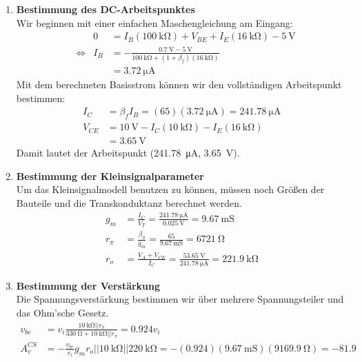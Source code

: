 \documentclass[11pt,a4paper,titlepage]{article}
\begin{document}
\begin{enumerate}
	\item \textbf{Bestimmung des DC-Arbeitspunktes}\\
	Wir beginnen mit einer einfachen Maschengleichung am Eingang:
	\begin{equation}
	\begin{aligned}
	&&0 &= I_B(\SI{100}{\kilo\ohm}) + V_{BE} + I_E(\SI{16}{\kilo\ohm}) - \SI{5}{\volt} \\
	&\Leftrightarrow &I_B  &= -\frac{\SI{0.7}{\volt} - \SI{5}{\volt}}{\SI{100}{\kilo\ohm} + (1+\beta_f)(\SI{16}{\kilo\ohm})} \\
	&&&= \SI{3.72}{\micro\ampere}
	\end{aligned}
	\end{equation}
	Mit dem berechneten Basisstrom können wir den vollständigen Arbeitspunkt bestimmen:
	\begin{equation}
	\begin{aligned}
	I_C &= \beta_fI_B = (65)(\SI{3.72}{\micro\ampere}) = \SI{241.78}{\micro\ampere}\\
	V_{CE} &= \SI{10}{\volt} - I_C(\SI{10}{\kilo\ohm}) - I_E(\SI{16}{\kilo\ohm}) \\
	       &= \SI{3.65}{\volt}
	\end{aligned}
	\end{equation}
	Damit lautet der Arbeitspunkt (\SI{241.78}{\micro\ampere}, \SI{3.65}{\volt}).
	
	\item \textbf{Bestimmung der Kleinsignalparameter}\\
	Um das Kleinsignalmodell benutzen zu können, müssen noch Größen der Bauteile und die Transkonduktanz berechnet werden.
	\begin{equation}
	\begin{aligned}
	   g_m &= \frac{I_C}{V_T} = \frac{\SI{241.78}{\micro\ampere}}{\SI{0.025}{\volt}} = \SI{9.67}{\milli\siemens} \\
	   r_{\pi} &= \frac{\beta_0}{g_m} = \frac{65}{\SI{9.67}{\milli\siemens}} = \SI{6721}{\ohm} \\
	   r_o &= \frac{V_A + V_{CE}}{I_C} = \frac{\SI{53.65}{\volt}}{\SI{241.78}{\micro\ampere}} = \SI{221.9}{\kilo\ohm}
	\end{aligned}
	\end{equation}
	\item \textbf{Bestimmung der Verstärkung} \\
	Die Spannungsverstärkung bestimmen wir über mehrere Spannungsteiler und das Ohm'sche Gesetz.
	\begin{equation}
	\begin{aligned}
	  v_{be} &= v_i\frac{\SI{10}{\kilo\ohm}||r_{\pi}}{\SI{330}{\ohm} + \SI{10}{\kilo\ohm}||r_{\pi}} = 0.924v_i \\
	  A_v^{CS} &= - \frac{v_{be}}{v_i}g_mr_o||\SI{10}{\kilo\ohm}||\SI{220}{\kilo\ohm} = -(0.924)(\SI{9.67}{\milli\siemens})(\SI{9169.9}{\ohm}) = -81.9
	\end{aligned}
	\end{equation}
	

\end{enumerate}
\end{document}
